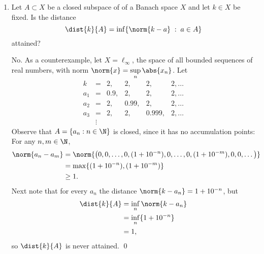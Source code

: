 \documentclass[12pt,letterpaper]{article}
\begin{document}
\begin{enumerate}
\begin{proof}
($\int_A = 0$) Let $A=\{(x,y)\in[0,1]^2 : f(x,y)>0\}$, and suppose for contradiction that $\mu(A)>0$. This gives us that 
$$\int_A f \der\mu >0.$$
Since $\mu$ is Borel-regular, there exists a Borel set $B\supset A$ such that $\mu(B)=\mu(A)$. This means that $\mu(B\setminus A)=0$. Therefore 
\begin{align*}
\int_A f\der\mu &= \int_B f\der\mu - \int_{B\setminus A} f\der\mu \\
&= \int_B f\der\mu \\
&=0 \quad\quad\quad\quad\text{since $B$ is Borel.}
\end{align*}
This contradicts that $\int_A f\der\mu>0$, and so we conclude that $\mu(A)=0$. 
\end{proof}

\pagebreak
\item Let $A \subset X$ be a closed subspace of of a Banach space $X$ and let $k\in X$ be fixed. Is the distance 
$$\dist{k}{A}=\inf\{\norm{k-a} \;:\; a\in A\}$$
attained? 

\answer No. As a counterexample, let $X=\ell_\infty$, the space of all bounded sequences of real numbers, with norm $\norm{x}=\sup\limits_n \abs{x_n}$. Let 
\[\begin{array}{rcllll}
k&= &2, &2, &2, &2, \dots \\
a_1&= &0.9, &2, &2, &2, \dots \\ 
a_2&= &2, &0.99, &2, &2, \dots \\ 
a_3&= &2, &2, &0.999, &2, \dots \\ 
&\vdots
\end{array}\]
Observe that $A=\{a_n : n\in \N\}$ is closed, since it has no accumulation points: For any $n,m\in\N$, 
\begin{align*}
\norm{a_n-a_m}&=\norm{\big(0,0,\dots,0, (1+10^{-n}), 0, \dots, 0, (1+10^{-m}), 0, 0, \dots\big)} \\
&= \max\{(1+10^{-n}), (1+10^{-m})\} \\
&\geq1.
\end{align*}
Next note that for every $a_n$ the distance $\norm{k-a_n}=1+10^{-n}$, but
\begin{align*}
\dist{k}{A}
&=\inf\limits_n\norm{k-a_n} \\
&=\inf\limits_n\{1+10^{-n}\} \\
&=1,
\end{align*}
so $\dist{k}{A}$ is never attained. \qed
\end{enumerate}
\end{document}

